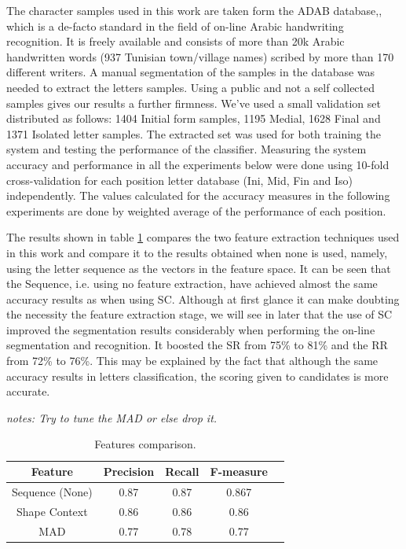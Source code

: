 \documentclass[10pt, conference, compsocconf]{IEEEtran}
\begin{document}
The character samples used in this work are taken form the ADAB database,\cite{el2009icdar}, which is a de-facto standard in the field of on-line Arabic handwriting recognition. 
It is freely available and consists of more than 20k Arabic handwritten words (937 Tunisian town/village names) scribed by more than 170 different writers. 
A manual segmentation of the samples in the database was needed to extract the letters samples.
Using a public and not a self collected samples gives our results a further firmness.
We've used a small validation set distributed as follows: 1404 Initial form samples, 1195 Medial, 1628 Final and 1371 Isolated letter samples. 
The extracted  set was used for both training the system and testing the performance of the classifier.
Measuring the system accuracy and performance in all the experiments below were done using 10-fold cross-validation for each position letter database (Ini, Mid, Fin and Iso) independently.
The values calculated for the accuracy measures in the following experiments are done by weighted average of the performance of each position.

The results shown in table \ref{table:features_comparison} compares the two feature extraction techniques used in this work and compare it to the results obtained when none is used, namely, using the letter sequence as the vectors in the feature space.
It can be seen that the Sequence, i.e. using no feature extraction, have achieved almost the same accuracy results as when using SC.
Although at first glance it can make doubting the necessity the feature extraction stage, we will see in later that the use of SC improved the segmentation results considerably when performing the on-line segmentation and recognition.
It boosted the SR from 75\% to 81\% and the RR from 72\% to 76\%.
This may be explained by the fact that although the same accuracy results in letters classification, the scoring given to candidates is more accurate.


\emph{notes: Try to tune the MAD or else drop it.}
\begin{table}
\centering
\begin{tabular}{ | c | c | c | c | c |}
\hline
Feature & Precision & Recall & F-measure \\
\hline                 
  Sequence  (None) &  0.87 & 0.87 & 0.867 \\
  \hline
  Shape Context & 0.86 & 0.86 & 0.86 \\
  \hline
  MAD & 0.77 & 0.78 & 0.77 \\
  \hline
\end{tabular}
\caption{Features comparison. }
\label{table:features_comparison} 
\end{table}
\end{document}
